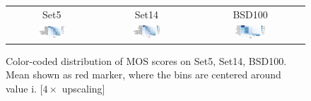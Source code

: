 \documentclass[10pt,twocolumn,letterpaper]{article}
\begin{document}
\begin{figure}[h!]
  	\begin{tabular}{ccc}
  		 Set5 & Set14 & BSD100 \\
     	\includegraphics[width=0.3\textwidth]{images/used/appendix/jpg/MOS/MOS_heatmap_Set5_cropped}&
     	\includegraphics[width=0.3\textwidth]{images/used/appendix/jpg/MOS/MOS_heatmap_Set14_cropped} &
     	\includegraphics[width=0.3\textwidth]{images/used/appendix/jpg/MOS/MOS_heatmap_BSD100_cropped} \\
     \end{tabular}
     \caption{Color-coded distribution of MOS scores on Set5, Set14, BSD100. Mean shown as red marker, where the bins are centered around value i. [$4\times$ upscaling]}
     \label{fig:app_mosdist}
\end{figure}
\end{document}
